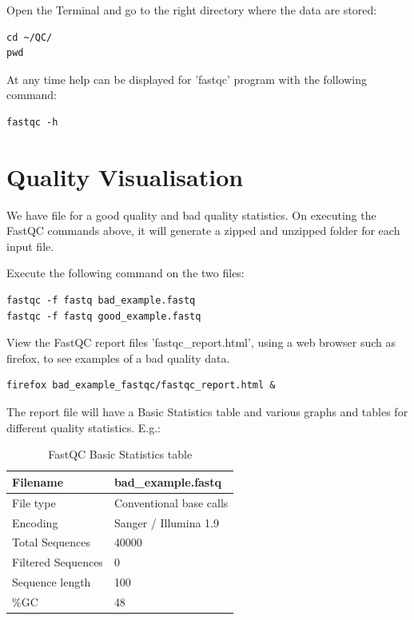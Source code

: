 \begin{steps}
Open the Terminal and go to the right directory where the data are stored:
\begin{lstlisting}
cd ~/QC/
pwd
\end{lstlisting}

At any time help can be displayed for 'fastqc' program with the following command:
\begin{lstlisting}
fastqc -h
\end{lstlisting}

\end{steps}


\section{Quality Visualisation}

\begin{information}
We have file for a good quality and bad quality statistics. On executing the
FastQC commands above, it will generate a zipped and unzipped folder for each
input file.
\end{information}

\begin{steps}
Execute the following command on the two files:
\begin{lstlisting}
fastqc -f fastq bad_example.fastq 
fastqc -f fastq good_example.fastq
\end{lstlisting}

View the FastQC report files 'fastqc\_report.html', using a web browser such as
firefox, to see examples of a bad quality data.

\begin{lstlisting}
firefox bad_example_fastqc/fastqc_report.html &
\end{lstlisting}

\end{steps}

\begin{note}
The report file will have a Basic Statistics table and various graphs and tables
for different quality statistics. E.g.:
\end{note}

\begin{table}[htbp]
  \centering
  \caption{FastQC Basic Statistics table}
    \begin{tabular}{ll}
    \toprule
    Filename & bad\_example.fastq \\
    \midrule
    File type & Conventional base calls \\
    Encoding & Sanger / Illumina 1.9 \\
    Total Sequences & 40000 \\
    Filtered Sequences & 0 \\
    Sequence length & 100 \\
    \%GC  & 48 \\
    \bottomrule
    \end{tabular}%
  \label{tab:badexampleuntrimmed}%
\end{table}%

